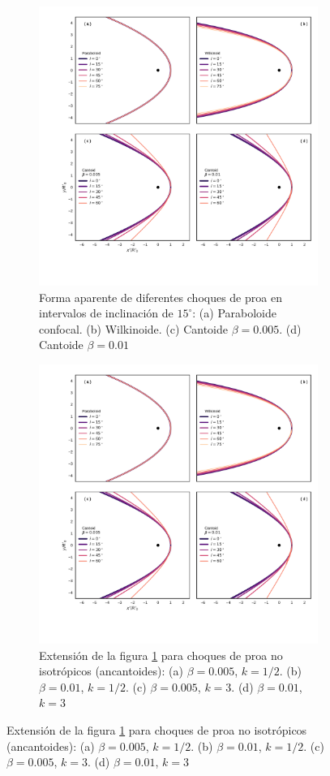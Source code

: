 \begin{figure}
\begin{figure}
  \includegraphics[width=\linewidth]{./Figures/cantoid-apparent-shape}
  \caption{Forma aparente de diferentes choques de proa en intervalos de inclinación de $15^\circ$: (a) Paraboloide confocal. (b) Wilkinoide. (c) Cantoide $\beta=0.005$. (d) Cantoide $\beta=0.01$}
  \label{fig:apparent-cantoid}
\end{figure}

\begin{figure}
  \includegraphics[width=\linewidth]{./Figures/cantoid-apparent-shape}
  \caption{Extensión de la figura \ref{fig:apparent-cantoid} para choques de proa no isotrópicos (ancantoides): (a) $\beta=0.005$, $k=1/2$. (b) $\beta=0.01$, $k=1/2$. (c) $\beta=0.005$, $k=3$. (d) $\beta=0.01$, $k=3$}
  \label{fig:apparent-ancantoid}
\end{figure}


\end{figure}

